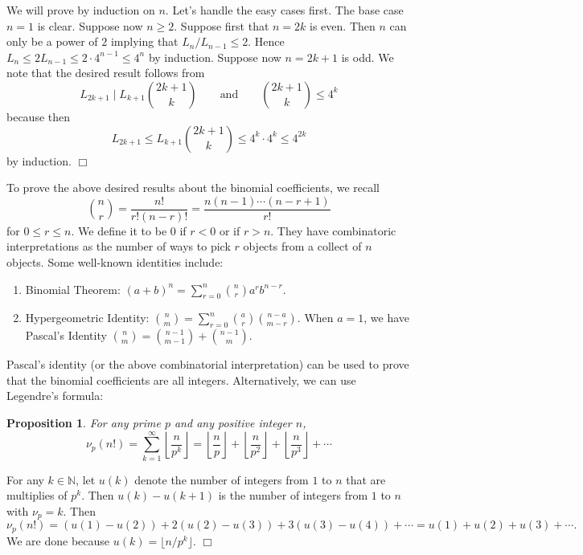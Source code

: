 \documentclass{article}
\def\N{{\mathbb N}}
\newtheorem{proposition}[subsection]{Proposition}
\newenvironment{proof}{\noindent {\bf Proof:}}{$\Box$ \vspace{2 ex}}
\begin{document}
\begin{proof}
    We will prove by induction on $n$. Let's handle the easy cases first. The base case $n = 1$ is clear. Suppose now $n\geq 2$. Suppose first that $n = 2k$ is even. Then $n$ can only be a power of $2$ implying that $L_n/L_{n-1}\leq 2.$ Hence $L_n \leq 2 L_{n-1} \leq 2\cdot 4^{n-1}\leq 4^n$ by induction. Suppose now $n = 2k+1$ is odd. We note that the desired result follows from
    $$L_{2k+1}\mid L_{k+1}\binom{2k+1}{k}\qquad\mbox{and}\qquad \binom{2k+1}{k} \leq 4^k$$
    because then $$L_{2k+1} \leq L_{k+1} \binom{2k+1}{k} \leq 4^k\cdot 4^k\leq 4^{2k}$$
    by induction.
\end{proof}

To prove the above desired results about the binomial coefficients, we recall
$$\binom{n}{r} = \frac{n!}{r!(n-r)!} = \frac{n(n-1)\cdots(n-r+1)}{r!}$$
for $0\leq r\leq n$. We define it to be $0$ if $r<0$ or if $r>n$. They have combinatoric interpretations as the number of ways to pick $r$ objects from a collect of $n$ objects. Some well-known identities include:
\begin{enumerate}
    \item Binomial Theorem: $\displaystyle (a+b)^n = \sum_{r=0}^n \binom{n}{r}a^rb^{n-r}$.
    \item Hypergeometric Identity: $\displaystyle \binom{n}{m} = \sum_{r=0}^n \binom{a}{r}\binom{n-a}{m-r}.$ When $a=1$, we have Pascal's Identity $\displaystyle \binom{n}{m} = \binom{n-1}{m-1} + \binom{n-1}{m}.$
\end{enumerate}
Pascal's identity (or the above combinatorial interpretation) can be used to prove that the binomial coefficients are all integers. Alternatively, we can use Legendre's formula:

\begin{proposition}
    For any prime $p$ and any positive integer $n$,
    $$\nu_p(n!) = \sum_{k=1}^\infty \left\lfloor\frac{n}{p^k}\right\rfloor = \left\lfloor\frac{n}{p}\right\rfloor + \left\lfloor\frac{n}{p^2}\right\rfloor + \left\lfloor\frac{n}{p^3}\right\rfloor + \cdots$$
\end{proposition}

\begin{proof}
    For any $k\in\N$, let $u(k)$ denote the number of integers from $1$ to $n$ that are multiplies of $p^k$. Then $u(k) - u(k+1)$ is the number of integers from $1$ to $n$ with $\nu_p = k$. Then
    $$\nu_p(n!) = (u(1)-u(2)) + 2(u(2)-u(3)) + 3(u(3)-u(4)) + \cdots = u(1) + u(2) + u(3) + \cdots.$$
    We are done because $u(k) = \lfloor n/p^k\rfloor.$
\end{proof}
\end{document}
